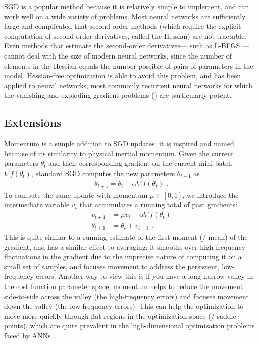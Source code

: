 SGD is a popular method because it is relatively simple to implement,
and can work well on a wide variety of problems.
Most neural networks are sufficiently large and complicated that
second-order methods
(which require the explicit computation of second-order derivatives, called the Hessian)
are not tractable.
Even methods that estimate the second-order derivatives---%
such as L-BFGS \parencite{Liu1989}---%
cannot deal with the size of modern neural networks,
since the number of elements in the Hessian equals
the number possible of pairs of parameters in the model.
Hessian-free optimization \parencite{Martens2010} is able to avoid this problem,
and has been applied to neural networks,
most commonly recurrent neural networks for which
the vanishing and exploding gradient problems ()
are particularly potent.


\subsection{Extensions}

Momentum \parencite{Polyak1964} is a simple addition to SGD updates;
it is inspired and named because of its similarity to physical inertial momentum.
Given the current parameters $\theta_t$
and their corresponding gradient on the current mini-batch $\nabla f(\theta_t)$,
standard SGD computes the new parameters $\theta_{t+1}$ as
\begin{align}
  \theta_{t+1} = \theta_t - \alpha \nabla f(\theta_t) \text{ .}
\end{align}
To compute the same update with momentum $\mu \in [0, 1]$,
we introduce the intermediate variable $v_t$
that accumulates a running total of past gradients:
\begin{align}
  v_{t+1} &= \mu v_t - \alpha \nabla f(\theta_t) \\
  \theta_{t+1} &= \theta_t + v_{t+1} \text{ .}
\end{align}
This is quite similar to a running estimate of
the first moment (\ie/ mean) of the gradient,
and has a similar effect to averaging:
it smooths over high-frequency fluctuations in the gradient
due to the imprecise nature of computing it on a small set of samples,
and focuses movement to address the persistent, low-frequency errors.
Another way to view this is if you have a long narrow valley
in the cost function parameter space,
momentum helps to reduce the movement side-to-side across the valley
(the high-frequency errors)
and focuses movement down the valley (the low-frequency errors).
This can help the optimization to move more quickly through
flat regions in the optimization space (\ie/ saddle-points),
which are quite prevalent in the high-dimensional optimization problems
faced by ANNs \parencite{Dauphin2014}.

